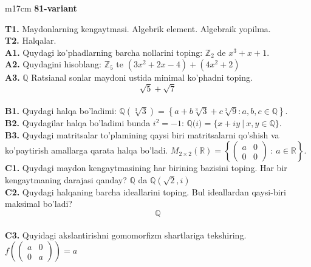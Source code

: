 \documentclass{article}
\begin{document}
\begin{tabular}{m{17cm}}
\textbf{81-variant}
\newline

\textbf{T1.} Maydonlarning kengaytmasi. Algebrik element. Algebraik yopilma. \\
\textbf{T2.} Halqalar. \\
\textbf{A1.} Quydagi ko'phadlarning barcha nollarini toping:
\(\mathbb{Z}_{2}\) de \(x^{3} + x + 1\). \\
\textbf{A2.} Quydagini hisoblang:
\(\mathbb{Z}_{5}\) te \(\left( 3x^{2} + 2x - 4 \right) + \left( 4x^{2} + 2 \right)\) \\
\textbf{A3.} \(\mathbb{Q}\) Ratsianal sonlar maydoni ustida minimal ko'phadni toping.
\[\sqrt{5} + \sqrt{7}\] \\
\textbf{B1.} Quydagi halqa bo'ladimi:
\(\mathbb{Q}\left( \sqrt[3]{3} \right) = \left\{ a + b\sqrt[3]{3} + c\sqrt[3]{9}:a,b,c \in \mathbb{Q} \right\}\). \\
\textbf{B2.} Quydagilar halqa bo'ladimi bunda \(i^{2} = - 1\):
\(\mathbb{Q(}i) = \{ x + iy\ |\ x,y \in \mathbb{Q\}}\). \\
\textbf{B3.} Quydagi matritsalar to'plamining qaysi biri matritsalarni qo'shish va ko'paytirish amallarga qarata halqa bo'ladi.
\(M_{2 \times 2}\mathbb{(R) =}\left\{ \begin{pmatrix}
a & 0 \\
0 & 0
\end{pmatrix}\ :\ a \in \mathbb{R} \right\}\). \\
\textbf{C1.} Quydagi maydon kengaytmasining har birining bazisini toping. Har bir kengaytmaning darajasi qanday?
\(\mathbb{Q}\) da \(\mathbb{Q}\left( \sqrt{2},i \right)\) \\
\textbf{C2.} Quydagi halqaning barcha ideallarini toping. Bul ideallardan qaysi-biri maksimal bo'ladi?
\[\mathbb{Q}\] \\
\textbf{C3.} Quyidagi akslantirishni gomomorfizm shartlariga tekshiring. \(f\left( \begin{pmatrix}
a & 0 \\
0 & a
\end{pmatrix} \right) = a\) \\

\end{tabular}
\vspace{1cm}
\end{document}
